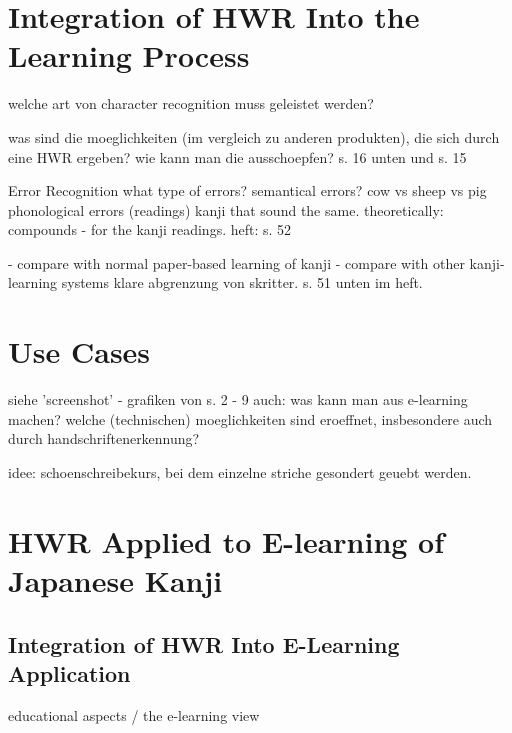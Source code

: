 


\section{Integration of HWR Into the Learning Process}
\label{sec:concept:integrationofhwrintolearning}


welche art von character recognition muss geleistet werden?

was sind die moeglichkeiten (im vergleich zu anderen produkten),
die sich durch eine HWR ergeben?
wie kann man die ausschoepfen? s. 16 unten und s. 15

Error Recognition
what type of errors?
semantical errors? cow vs sheep vs pig
phonological errors (readings) kanji that sound the same.
theoretically: compounds - for the kanji readings.
heft: s. 52

- compare with normal paper-based learning of kanji
- compare with other kanji-learning systems
klare abgrenzung von skritter.
s. 51 unten im heft.



\section{Use Cases}
\label{sec:concept:usecases}

siehe 'screenshot' - grafiken von s. 2 - 9
auch: was kann man aus e-learning machen?
welche (technischen) moeglichkeiten sind eroeffnet,
insbesondere auch durch handschriftenerkennung?

idee: schoenschreibekurs, bei dem einzelne striche
gesondert geuebt werden.


\section{HWR Applied to E-learning of Japanese Kanji}
\subsection{Integration of HWR Into E-Learning Application}
educational aspects / the e-learning view

